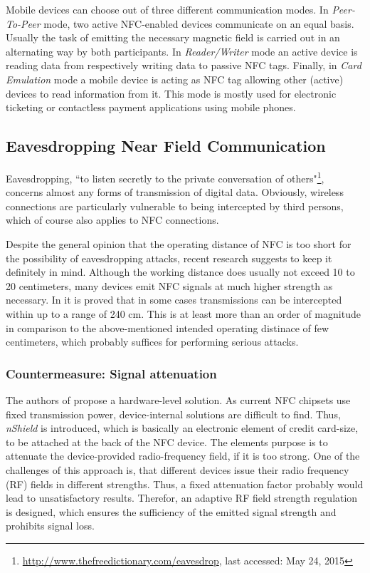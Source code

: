 \documentclass[12pt,a4paper]{article}
\begin{document}
Mobile devices can choose out of three different communication modes. In \emph{Peer-To-Peer} mode, two active NFC-enabled devices communicate on an equal basis. Usually the task of emitting the necessary magnetic field is carried out in an alternating way by both participants. In \emph{Reader/Writer} mode an active device is reading data from respectively writing data to passive NFC tags. Finally, in \emph{Card Emulation} mode a mobile device is acting as NFC tag allowing other (active) devices to read information from it. This mode is mostly used for electronic ticketing or contactless payment applications using mobile phones.

\subsection{Eavesdropping Near Field Communication}

Eavesdropping, ``to listen secretly to the private conversation of others"\footnote{\url{http://www.thefreedictionary.com/eavesdrop}, last accessed: May 24, 2015}, concerns almost any forms of transmission of digital data. Obviously, wireless connections are particularly vulnerable to being intercepted by third persons, which of course also applies to NFC connections. \cite{DBLP:conf/icitst/EvestiSS13}

Despite the general opinion that the operating distance of NFC is too short for the possibility of eavesdropping attacks, recent research suggests to keep it definitely in mind. Although the working distance does usually not exceed 10 to 20 centimeters, many devices emit NFC signals at much higher strength as necessary. In \cite{DBLP:conf/mobisys/ZhouX14} it is proved that in some cases transmissions can be intercepted within up to a range of 240 cm. This is at least more than an order of magnitude in comparison to the above-mentioned intended operating distinace of few centimeters, which probably suffices for performing serious attacks.

\subsubsection{Countermeasure: Signal attenuation}

The authors of \cite{DBLP:conf/mobisys/ZhouX14} propose a hardware-level solution. As current NFC chipsets use fixed transmission power, device-internal solutions are difficult to find. Thus, \emph{nShield} is introduced, which is basically an electronic element of credit card-size, to be attached at the back of the NFC device. The elements purpose is to attenuate the device-provided radio-frequency field, if it is too strong. One of the challenges of this approach is, that different devices issue their radio frequency (RF) fields in different strengths. Thus, a fixed attenuation factor probably would lead to unsatisfactory results. Therefor, an adaptive RF field strength regulation is designed, which ensures the sufficiency of the emitted signal strength and prohibits signal loss.
\end{document}
